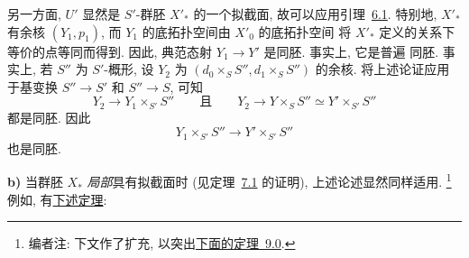 另一方面, \(U'\) 显然是
\(S'\)-群胚 \(X'_\ast\) 的一个拟截面, 故可以应用引理~\hyperref[lem:sga3-V-6.1]{6.1}.
特别地, \(X'_\ast\) 有余核 \((Y_1,p_1)\),
而 \(Y_1\) 的底拓扑空间由 \(X'_0\) 的底拓扑空间
将 \(X'_\ast\) 定义的关系下等价的点等同而得到.
因此, 典范态射
\(Y_1\to Y'\) 是同胚. 事实上, 它是普遍
同胚. 事实上, 若 \(S''\) 为 \(S'\)-概形, 设 \(Y_2\) 为
\((d_0\times_S S'',d_1\times_S S'')\) 的余核.
将上述论证应用于基变换 \(S''\to S'\) 和 \(S''\to S\), 可知
\[
  Y_2\longrightarrow Y_1\times_{S'}S''
  \qquad\text{且}\qquad
  Y_2\longrightarrow Y\times_SS''\simeq Y'\times_{S'}S''
\]
都是同胚. 因此
\[
  Y_1\times_{S'}S''\longrightarrow Y'\times_{S'}S''
\]
也是同胚.

\medskip
{}\label{par:sga3-V-9-b}%
\noindent\textbf{b)}\quad
当群胚 \(X_\ast\) \emph{局部}具有拟截面时
(见定理~\hyperref[thm:sga3-V-7.1]{7.1} 的证明),
上述论述显然同样适用.%
\footnote{\label{note:sga3-V-46}编者注: 下文作了扩充,
以突出\hyperref[thm:sga3-V-9.0]{下面的定理~9.0}.}
例如, 有\hyperref[thm:sga3-V-9.0]{下述定理}:

